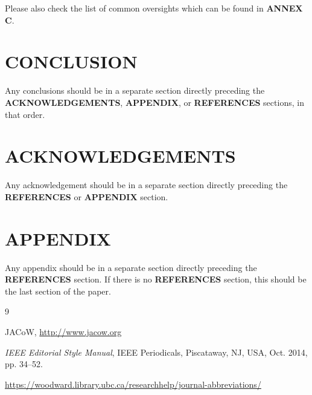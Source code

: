 \documentclass[a4paper,
               nospread,     %
               ]{jacow}
\begin{document}
Please also check the list of common oversights which can be found in \textbf{ANNEX C}.

\flushcolsend
\section{CONCLUSION}

Any conclusions should be in a separate section directly preceding
the \textbf{ACKNOWLEDGEMENTS}, \textbf{APPENDIX}, or \textbf{REFERENCES} sections, in that
order.

\section{ACKNOWLEDGEMENTS}
Any acknowledgement should be in a separate section directly preceding
the \textbf{REFERENCES} or \textbf{APPENDIX} section.


\section{APPENDIX}
Any appendix should be in a separate section directly preceding
the \textbf{REFERENCES} section. If there is no \textbf{REFERENCES} section,
this should be the last section of the paper.

%
%
%
	{\printbibliography}%
	{%
	
	\begin{thebibliography}{9} %
	
		JACoW,
		\url{http://www.jacow.org}
	
		\textit{IEEE Editorial Style Manual},
		IEEE Periodicals, Piscataway,
		NJ, USA, Oct. 2014, pp. 34--52.

	\url{https://woodward.library.ubc.ca/researchhelp/journal-abbreviations/}

	\end{thebibliography}
} %
%
% 

\end{document}
